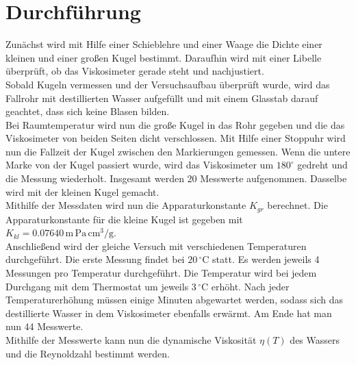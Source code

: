 \section{Durchführung}
\label{sec:Durchfuehrung}

Zunächst wird mit Hilfe einer Schieblehre und einer Waage die Dichte einer kleinen und einer großen Kugel bestimmt. Daraufhin wird mit einer
Libelle überprüft, ob das Viskosimeter gerade steht und nachjustiert.\\
Sobald Kugeln vermessen und der Versuchsaufbau überprüft wurde, wird das Fallrohr mit destillierten Wasser aufgefüllt und mit einem Glasstab darauf 
geachtet, dass sich keine Blasen bilden.\\
Bei Raumtemperatur wird nun die große Kugel in das Rohr gegeben und die das Viskosimeter von beiden Seiten dicht verschlossen. Mit Hilfe einer Stoppuhr
wird nun die Fallzeit der Kugel zwischen den Markierungen gemessen. Wenn die untere Marke von der Kugel passiert wurde, wird das Viskosimeter um $\mathrm{180^{\circ}}$
gedreht und die Messung wiederholt. Insgesamt werden 20 Messwerte aufgenommen. Dasselbe wird mit der kleinen Kugel gemacht.\\
Mithilfe der Messdaten wird nun die Apparaturkonstante $K_{gr}$ berechnet. Die Apparaturkonstante für die kleine Kugel ist gegeben mit $K_{kl} = 0.07640 \, \mathrm{m\,Pa\,cm^3/g}$.\\
Anschließend wird der gleiche Versuch mit verschiedenen Temperaturen durchgeführt. Die erste Messung findet bei $\mathrm{20\,{^\circ C}}$ statt. Es werden jeweils 4 Messungen pro
Temperatur durchgeführt. Die Temperatur wird bei jedem Durchgang mit dem Thermostat um jeweils $\mathrm{3\,{^\circ C}}$ erhöht. Nach jeder Temperaturerhöhung müssen
einige Minuten abgewartet werden, sodass sich das destillierte Wasser in dem Viskosimeter ebenfalls erwärmt. Am Ende hat man nun 44 Messwerte.\\
Mithilfe der Messwerte kann nun die dynamische Viskosität $\eta(T)$ des Wassers und die Reynoldzahl bestimmt werden.